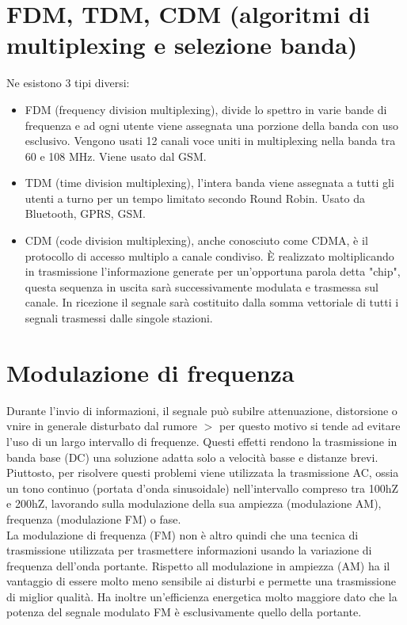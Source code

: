\documentclass{article}
\begin{document}
\section{FDM, TDM, CDM (algoritmi di multiplexing e selezione banda)}

Ne esistono 3 tipi diversi:
\begin{itemize}
	\item FDM (frequency division multiplexing), divide lo spettro in varie
		bande di frequenza e ad ogni utente viene assegnata una porzione della
		banda con uso esclusivo. Vengono usati 12 canali voce uniti in
		multiplexing nella banda tra 60 e 108 MHz. Viene usato dal GSM.

	\item TDM (time division multiplexing), l'intera banda viene assegnata a
		tutti gli utenti a turno per un tempo limitato secondo Round Robin.
		Usato da Bluetooth, GPRS, GSM.

	\item CDM (code division multiplexing), anche conosciuto come CDMA, è il
		protocollo di accesso multiplo a canale condiviso. È realizzato
		moltiplicando in trasmissione l'informazione generate per un'opportuna
		parola detta "chip", questa sequenza in uscita sarà successivamente
		modulata e trasmessa sul canale. In ricezione il segnale sarà costituito
		dalla somma vettoriale di tutti i segnali trasmessi dalle singole
		stazioni.
\end{itemize}

\section{Modulazione di frequenza}

Durante l'invio di informazioni, il segnale può subilre attenuazione,
distorsione o vnire in generale disturbato dal rumore $>$ per questo motivo si
tende ad evitare l'uso di un largo intervallo di frequenze. Questi effetti
rendono la trasmissione in banda base (DC) una soluzione adatta solo a velocità
basse e distanze brevi. Piuttosto, per risolvere questi problemi viene
utilizzata la trasmissione AC, ossia un tono continuo (portata d'onda
sinusoidale) nell'intervallo compreso tra 100hZ e 200hZ, lavorando sulla
modulazione della sua ampiezza (modulazione AM), frequenza (modulazione FM) o
fase.\\
La modulazione di frequenza (FM) non è altro quindi che una tecnica di
trasmissione utilizzata per trasmettere informazioni usando la variazione di
frequenza dell'onda portante. Rispetto all modulazione in ampiezza (AM) ha il
vantaggio di essere molto meno sensibile ai disturbi e permette una trasmissione
di miglior qualità. Ha inoltre un'efficienza energetica molto maggiore dato che
la potenza del segnale modulato FM è esclusivamente quello della portante.
\end{document}

